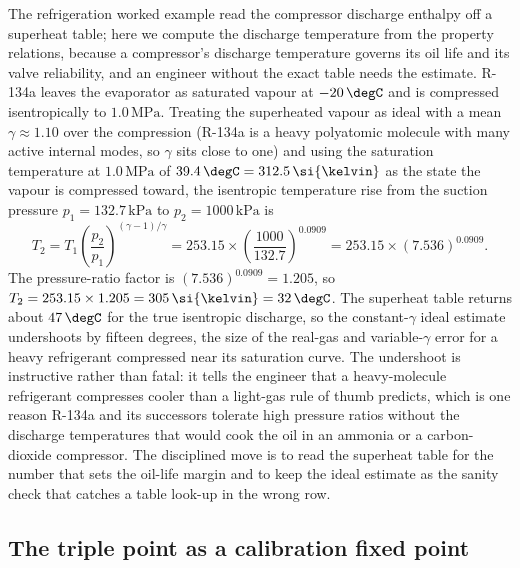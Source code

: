 The refrigeration worked example read the compressor discharge enthalpy off a
superheat table; here we compute the discharge temperature from the property
relations, because a compressor's discharge temperature governs its oil life
and its valve reliability, and an engineer without the exact table needs the
estimate. R-134a leaves the evaporator as saturated vapour at $-20\,\degC$
and is compressed isentropically to $1.0\,\text{MPa}$. Treating the
superheated vapour as ideal with a mean $\gamma \approx 1.10$ over the
compression (R-134a is a heavy polyatomic molecule with many active internal
modes, so $\gamma$ sits close to one) and using the saturation temperature at
$1.0\,\text{MPa}$ of $39.4\,\degC = 312.5\,\si{\kelvin}$ as the state the
vapour is compressed toward, the isentropic temperature rise from the suction
pressure $p_1 = 132.7\,\text{kPa}$ to $p_2 = 1000\,\text{kPa}$ is
\[
T_2 = T_1\left(\frac{p_2}{p_1}\right)^{(\gamma - 1)/\gamma} = 253.15\times
\left(\frac{1000}{132.7}\right)^{0.0909} = 253.15\times (7.536)^{0.0909}.
\]
The pressure-ratio factor is $(7.536)^{0.0909} = 1.205$, so $T_2 = 253.15
\times 1.205 = 305\,\si{\kelvin} = 32\,\degC$. The superheat table returns
about $47\,\degC$ for the true isentropic discharge, so the constant-$\gamma$
ideal estimate undershoots by fifteen degrees, the size of the real-gas and
variable-$\gamma$ error for a heavy refrigerant compressed near its
saturation curve. The undershoot is instructive rather than fatal: it tells
the engineer that a heavy-molecule refrigerant compresses cooler than a
light-gas rule of thumb predicts, which is one reason R-134a and its
successors tolerate high pressure ratios without the discharge temperatures
that would cook the oil in an ammonia or a carbon-dioxide compressor. The
disciplined move is to read the superheat table for the number that sets the
oil-life margin and to keep the ideal estimate as the sanity check that
catches a table look-up in the wrong row.

\subsection{The triple point as a calibration fixed point}

